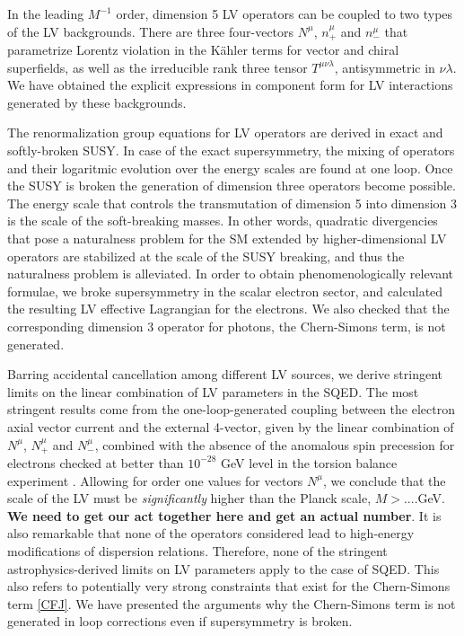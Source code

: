 \documentclass[12pt]{revtex4}
\begin{document}
In the leading $M^{-1}$ order, dimension 5 LV operators can be coupled to
two types of the LV backgrounds. There are three four-vectors 
$N^\mu$, $n^\mu_+$ and $n^{\mu}_-$
that parametrize Lorentz violation in the K\"ahler terms for vector and chiral superfields, 
as well as the irreducible rank three tensor $T^{\mu\nu\lambda}$, antisymmetric in $\nu\lambda$. 
We have obtained the explicit expressions in component form for LV interactions generated by these 
backgrounds. 

The renormalization group equations for LV operators are derived 
in exact and softly-broken SUSY. In case of the exact supersymmetry, 
the mixing of operators and their logaritmic evolution over the energy scales are 
found at one loop. Once the SUSY is broken the generation of dimension 
three operators become possible. The energy scale that controls the transmutation 
of dimension 5 into dimension 3 is the scale of the soft-breaking masses. 
In other words, quadratic divergencies that pose a naturalness problem for the 
SM extended by higher-dimensional LV operators are stabilized at the scale of the 
SUSY breaking, and thus the naturalness problem is alleviated. 
In order to obtain phenomenologically relevant formulae, we broke supersymmetry in the
scalar electron sector, and calculated the resulting LV effective Lagrangian for the 
electrons. We also checked that the corresponding dimension 3 operator for photons, 
the Chern-Simons term, is not generated. 

Barring accidental cancellation among different LV sources, we derive 
stringent limits on the linear combination of LV parameters in the 
SQED. The most stringent results come from the one-loop-generated 
coupling between the electron axial vector current and the external 
4-vector, given by the linear combination of $N^\mu$, $N^\mu_+$ and $N^{\mu}_-$,
combined with the absence of the anomalous spin precession for 
electrons checked at better than $10^{-28}$ GeV level in the 
torsion balance experiment \cite{Heckel:1999sy}. Allowing for order one values for 
vectors $N^\mu$, we conclude that the scale of the LV must be {\em significantly}
higher than the Planck scale, $M> $....GeV. {\bf We need to get our act together here 
and get an actual number}. It is also remarkable that none of the 
operators considered lead to high-energy modifications of dispersion relations. 
Therefore, none of the stringent astrophysics-derived limits on LV parameters 
\cite{Ted1,GK} apply to the case of SQED. This also refers to potentially very strong 
 constraints that exist for the Chern-Simons term \ref{CFJ}. We have presented 
 the arguments why the Chern-Simons term is not generated in loop corrections 
 even if supersymmetry is broken. 
 
\end{document}
